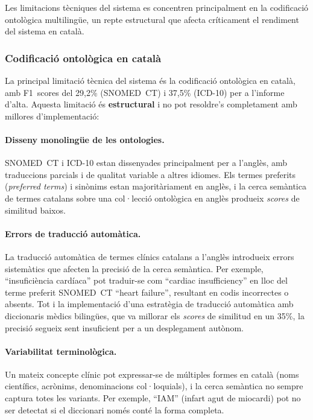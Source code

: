 \documentclass[CAT]{TFUOC}%
\begin{document}
Les limitacions tècniques del sistema es concentren principalment en la codificació ontològica multilingüe, un repte estructural que afecta críticament el rendiment del sistema en català.

\subsubsection{Codificació ontològica en català}

La principal limitació tècnica del sistema és la codificació ontològica en català, amb F1~scores del 29,2\% (SNOMED~CT) i 37,5\% (ICD-10) per a l'informe d'alta. Aquesta limitació és \textbf{estructural} i no pot resoldre's completament amb millores d'implementació:

\paragraph{Disseny monolingüe de les ontologies.}
SNOMED~CT i ICD-10 estan dissenyades principalment per a l'anglès, amb traduccions parcials i de qualitat variable a altres idiomes. Els termes preferits (\textit{preferred terms}) i sinònims estan majoritàriament en anglès, i la cerca semàntica de termes catalans sobre una col·lecció ontològica en anglès produeix \textit{scores} de similitud baixos.

\paragraph{Errors de traducció automàtica.}
La traducció automàtica de termes clínics catalans a l'anglès introdueix errors sistemàtics que afecten la precisió de la cerca semàntica. Per exemple, ``insuficiència cardíaca'' pot traduir-se com ``cardiac insufficiency'' en lloc del terme preferit SNOMED~CT ``heart failure'', resultant en codis incorrectes o absents. Tot i la implementació d'una estratègia de traducció automàtica amb diccionaris mèdics bilingües, que va millorar els \textit{scores} de similitud en un 35\%, la precisió segueix sent insuficient per a un desplegament autònom.

\paragraph{Variabilitat terminològica.}
Un mateix concepte clínic pot expressar-se de múltiples formes en català (noms científics, acrònims, denominacions col·loquials), i la cerca semàntica no sempre captura totes les variants. Per exemple, ``IAM'' (infart agut de miocardi) pot no ser detectat si el diccionari només conté la forma completa.
\end{document}
